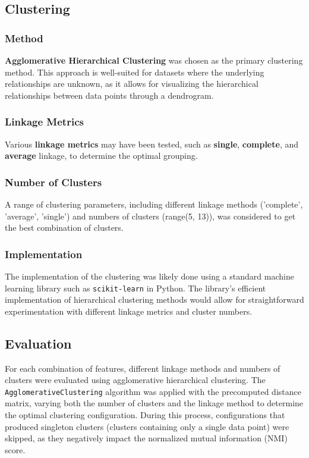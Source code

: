 \documentclass{article}
\begin{document}
\subsection{Clustering}

\subsubsection{Method}
\textbf{Agglomerative Hierarchical Clustering} was chosen as the primary clustering method. This approach is well-suited for datasets where the underlying relationships are unknown, as it allows for visualizing the hierarchical relationships between data points through a dendrogram.

\subsubsection{Linkage Metrics}
Various \textbf{linkage metrics} may have been tested, such as \textbf{single}, \textbf{complete}, and \textbf{average} linkage, to determine the optimal grouping.

\subsubsection{Number of Clusters}
A range of clustering parameters, including different linkage methods (’complete’, ’average’, ’single’) and numbers of clusters (range(5, 13)), was considered to get the best combination of clusters.

\subsubsection{Implementation}
The implementation of the clustering was likely done using a standard machine learning library such as \texttt{scikit-learn} in Python. The library’s efficient implementation of hierarchical clustering methods would allow for straightforward experimentation with different linkage metrics and cluster numbers.

\subsection{Evaluation}
For each combination of features, different linkage methods and numbers of clusters were evaluated using agglomerative hierarchical clustering. The \texttt{AgglomerativeClustering} algorithm was applied with the precomputed distance matrix, varying both the number of clusters and the linkage method to determine the optimal clustering configuration. During this process, configurations that produced singleton clusters (clusters containing only a single data point) were skipped, as they negatively impact the normalized mutual information (NMI) score.
\end{document}
